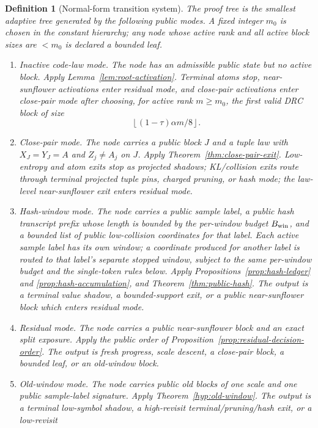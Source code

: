 \documentclass[11pt]{article}
\newtheorem{definition}[theorem]{Definition}
\begin{document}
\begin{definition}[Normal-form transition system]
\label{def:transition-system}
The proof tree is the smallest adaptive tree generated by the following
public modes.  A fixed integer $m_0$ is chosen in the constant hierarchy; any
node whose active rank and all active block sizes are $<m_0$ is declared a
bounded leaf.
\begin{enumerate}[label=\textup{(\arabic*)}]
\item Inactive code-law mode.  The node has an admissible public state but no
active block.  Apply Lemma~\ref{lem:root-activation}.  Terminal atoms stop,
near-sunflower activations enter residual mode, and close-pair activations
enter close-pair mode after choosing, for active rank $m\ge m_0$, the first
valid DRC block of size
\[
  \left\lfloor (1-\tau)\alpha m/8\right\rfloor .
\]
\item Close-pair mode.  The node carries a public block $J$ and a tuple law
with $X_J=Y_J=A$ and $Z_j\ne A_j$ on $J$.  Apply
Theorem~\ref{thm:close-pair-exit}.  Low-entropy and atom exits stop as
projected shadows; KL/collision exits route through terminal projected tuple
pins, charged pruning, or hash mode; the law-level near-sunflower exit enters
residual mode.
\item Hash-window mode.  The node carries a public sample label, a public hash
transcript prefix whose length is bounded by the per-window budget
$B_{\rm win}$, and a bounded list of public low-collision coordinates for
that label.  Each active sample label has its own window; a coordinate produced
for another label is routed to that label's separate stopped window, subject to
the same per-window budget and the single-token rules below.  Apply
Propositions~\ref{prop:hash-ledger} and \ref{prop:hash-accumulation}, and
Theorem~\ref{thm:public-hash}.  The
output is a terminal value shadow, a bounded-support exit, or a public
near-sunflower block which enters residual mode.
\item Residual mode.  The node carries a public near-sunflower block and an
exact split exposure.  Apply the public order of
Proposition~\ref{prop:residual-decision-order}.  The output is fresh
progress, scale descent, a close-pair block, a bounded leaf, or an old-window
block.
\item Old-window mode.  The node carries public old blocks of one scale and one
public sample-label signature.
Apply Theorem~\ref{hyp:old-window}.  The output is a terminal low-symbol
shadow, a high-revisit terminal/pruning/hash exit, or a low-revisit

\end{enumerate}
\end{definition}
\end{document}
